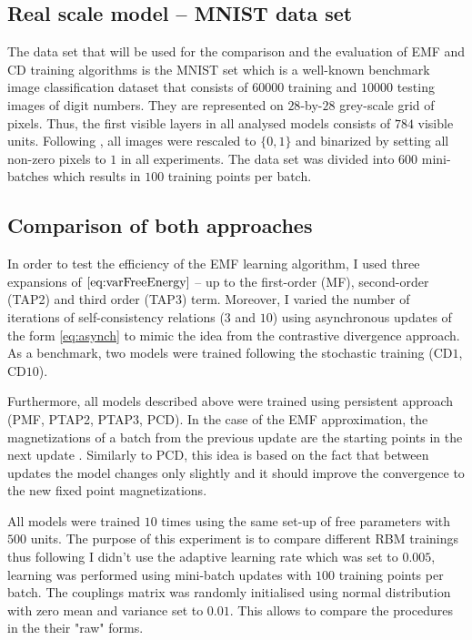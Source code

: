 \documentclass[../report/report.tex]{subfiles}
\begin{document}
\subsection{Real scale model -- MNIST data set}
The data set that will be used for the comparison and the evaluation of EMF and CD training algorithms is the MNIST set \cite{lecun1998} which is a well-known benchmark image classification dataset that consists of $60000$ training and $10000$ testing images of digit numbers. They are represented
on $28$-by-$28$ grey-scale grid of pixels. Thus, the first visible layers in all analysed models consists of $784$ visible units. Following \cite{gabrie2015training}, \cite{salakhutdinov2008learning} all images were rescaled to $ \lbrace 0, 1 \rbrace $ and binarized by setting all non-zero pixels to $1$ in all experiments.
The data set was divided into $600$ mini-batches which results in $100$ training points per batch.

\subsection{Comparison of both approaches}
In order to test the efficiency of the EMF learning algorithm, I used three expansions of $\ref{eq:varFreeEnergy}$ -- up to the first-order (MF), second-order (TAP2) and third order (TAP3) term. Moreover, I varied the number of iterations of self-consistency relations ($3$ and $10$) using asynchronous updates of the form \ref{eq:asynch} to mimic the idea from the contrastive divergence approach. As a benchmark, two models were trained following the stochastic training (CD$1$, CD$10$).

Furthermore, all models described above were trained using persistent approach (PMF, PTAP2, PTAP3, PCD). In the case of the EMF approximation, the magnetizations of a batch  from the previous update are the starting points in the next update \cite{gabrie2015training}. Similarly to PCD, this idea is based on the fact that between updates the model changes only slightly and it should improve the convergence to the new fixed point magnetizations.

All models were trained $10$ times using the same set-up of free parameters with $500$ units. The purpose of this experiment is to compare different RBM trainings thus following \cite{gabrie2015training} I didn't use the adaptive learning rate which was set to $0.005$, learning was performed using mini-batch updates with $100$ training points per batch. The couplings matrix was randomly initialised using normal distribution with zero mean and variance set to $0.01$. This allows to compare the procedures in the their "raw" forms. 
\end{document}
